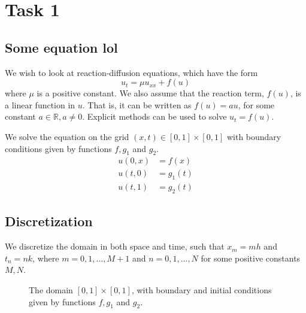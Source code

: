 \section{Task 1}

\subsection{Some equation lol}

We wish to look at reaction-diffusion equations, which have the form
\begin{equation}
    \label{eq:original_eq}
     u_t = \mu u_{xx} + f(u)
\end{equation}
where $\mu$ is a positive constant.
We also assume that the reaction term,
$f(u)$, is a linear function in \( u \).
That is, it can be written as \( f(u) = au \),
for some constant \( a \in \mathbb{R}, a \neq 0 \).
Explicit methods can be used to solve $u_t = f(u)$.

We solve the equation on
the grid \( (x, t) \in [0, 1] \times [0, 1] \)
with boundary conditions given by functions
\( f, g_1 \) and \( g_2 \).
\begin{align*}
  u(0, x) &= f(x) \\
  u(t, 0) &= g_1(t) \\
  u(t, 1) &= g_2(t)
\end{align*}

\subsection{Discretization}

We discretize the domain in both space and time,
such that $x_m = mh$ and $t_n = nk$,
where \( m = 0, 1, \dots, M + 1\) and \( n = 0, 1, \dots, N \)
for some positive constants \( M, N \).

\begin{figure}[!h]
\centering
\label{fig:disc}
\caption{The domain \( [0, 1] \times [0, 1] \), with boundary and initial conditions
given by functions \( f, g_1 \) and \( g_2 \).}
\end{figure}

